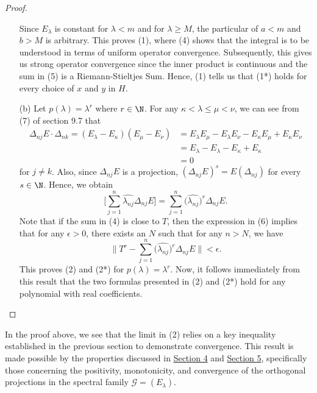 \begin{proof}
\begin{enumerate}
        
        Since \( {E}_{\lambda} \) is constant for \( \lambda < m  \) and for \( \lambda \geq M  \), the particular of \( a < m  \) and \( b > M  \) is arbitrary. This proves (1), where (4) shows that the integral is to be understood in terms of uniform operator convergence. Subsequently, this gives us strong operator convergence  since the inner product is continuous and the sum in (5) is a Riemann-Stieltjes Sum. Hence, (1) tells us that (1*) holds for every choice of \( x  \) and \( y  \) in \( H  \).
    \item[(b)] Let \( p(\lambda) = \lambda^{r} \) where \( r \in \N \). For any \( \kappa < \lambda \leq \mu < \nu \), we can see from (7) of section 9.7 that 
        \begin{align*}
            \Delta_{nj} E  \cdot \Delta_{nk} =   ({E}_{\lambda} - {E}_{\kappa} ) ({E}_{\mu} - {E}_{\nu}) &= {E}_{\lambda} {E}_{\mu} - {E}_{\lambda } {E}_{\nu} - {E}_{\kappa} {E}_{\mu} + {E}_{\kappa} {E}_{\nu} \\
                                                                                                         &= {E}_{\lambda} - {E}_{\lambda} - {E}_{\kappa} + {E}_{\kappa} \\
                                                                                                         &= 0
        \end{align*}
        for \( j \neq k  \). Also, since \( {\Delta}_{nj} E  \) is a projection, \( (\Delta_{nj} E )^{s} = E (\Delta_{nj}) \) for every \( s \in \N  \). Hence, we obtain
        \[  \Big[ \sum_{ j=1  }^{ n } \hat{{\lambda}_{nj}} \Delta_{nj} E \Big] = \sum_{ j=1  }^{ n } \Big(\hat{{\lambda}_{nj}}\Big)^{r} \Delta_{nj} E.  \tag{6} \]
        Note that if the sum in (4) is close to \( T  \), then the expression in (6) implies that for any \( \epsilon > 0  \), there exists an \( N  \) such that for any \( n > N  \), we have 
        \[  \Big\|T^{r} - \sum_{ j=1  }^{ n } \Big(\hat{{\lambda}_{nj}}\Big)^{r}  \Delta_{nj} E \Big\| < \epsilon. \]
        This proves (2) and (2*) for \( p(\lambda) = \lambda^{r} \). Now, it follows immediately from this result that the two formulas presented in (2) and (2*) hold for any polynomial with real coefficients.
\end{enumerate}
\end{proof}

In the proof above, we see that the limit in (2) relies on a key inequality established in the previous section to demonstrate convergence. This result is made possible by the properties discussed in {\hyperref[section 4]{Section 4}} and {\hyperref[section 5]{Section 5}}, specifically those concerning the positivity, monotonicity, and convergence of the orthogonal projections in the spectral family \( \mathcal{G} = ({E}_{\lambda}) \).


